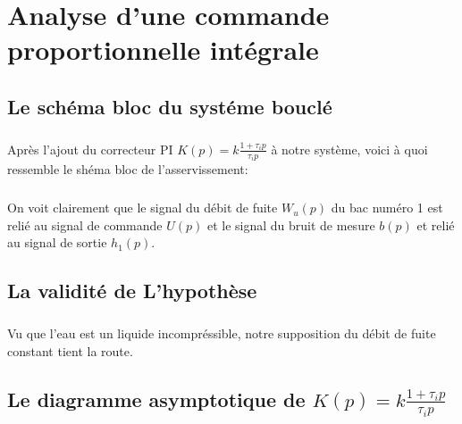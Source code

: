 \documentclass[12pt, a4paper, openany]{report}
\begin{document}
    
   
   

\chapter{Analyse d'une commande proportionnelle intégrale}

 \section{Le schéma bloc du systéme bouclé} 

\paragraph{}
	Après l'ajout du correcteur PI $K(p)= k \frac {1+\tau_{i}p}{\tau_{i}p}$ à notre système, voici à quoi ressemble le       shéma bloc de l'asservissement:
  \begin{center}
    \label{fig2}
  \end{center}    
 
 \paragraph{}
	On voit clairement que le signal du débit de fuite $W_{u}(p)$ du bac numéro 1 est relié au signal de commande $U(p)$ et le signal du bruit de mesure $b(p)$ et relié au signal de sortie $h_{1}(p)$.    
	
 \section{La validité de L'hypothèse} 
  
 \paragraph{}       
	Vu que l'eau est un liquide incompréssible, notre supposition du débit de fuite constant tient la route.
	
 \section{Le diagramme asymptotique de $K(p)= k \frac {1+\tau_{i}p}{\tau_{i}p}$} 
 
\end{document}
